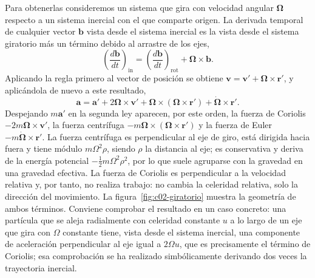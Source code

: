 \documentclass[10pt,openany]{book}
\begin{document}
Para obtenerlas consideremos un sistema que gira con velocidad angular \(\boldsymbol{\Omega}\) respecto a un sistema inercial con el que comparte origen. La derivada temporal de cualquier vector \(\mathbf{b}\) vista desde el sistema inercial es la vista desde el sistema giratorio más un término debido al arrastre de los ejes,
\begin{equation}
\left(\frac{d\mathbf{b}}{dt}\right)_{\mathrm{in}} = \left(\frac{d\mathbf{b}}{dt}\right)_{\mathrm{rot}} + \boldsymbol{\Omega}\times\mathbf{b}. \label{eq:c02-regla}
\end{equation}
Aplicando la regla primero al vector de posición se obtiene \(\mathbf{v} = \mathbf{v}' + \boldsymbol{\Omega}\times\mathbf{r}'\), y aplicándola de nuevo a este resultado,
\begin{equation}
\mathbf{a} = \mathbf{a}' + 2\boldsymbol{\Omega}\times\mathbf{v}' + \boldsymbol{\Omega}\times\left(\boldsymbol{\Omega}\times\mathbf{r}'\right) + \dot{\boldsymbol{\Omega}}\times\mathbf{r}'. \label{eq:c02-acel}
\end{equation}
Despejando \(m\mathbf{a}'\) en la segunda ley aparecen, por este orden, la fuerza de Coriolis \(-2m\boldsymbol{\Omega}\times\mathbf{v}'\), la fuerza centrífuga \(-m\boldsymbol{\Omega}\times(\boldsymbol{\Omega}\times\mathbf{r}')\) y la fuerza de Euler \(-m\dot{\boldsymbol{\Omega}}\times\mathbf{r}'\). La fuerza centrífuga es perpendicular al eje de giro, está dirigida hacia fuera y tiene módulo \(m\Omega^{2}\rho\), siendo \(\rho\) la distancia al eje; es conservativa y deriva de la energía potencial \(-\tfrac12 m\Omega^{2}\rho^{2}\), por lo que suele agruparse con la gravedad en una gravedad efectiva. La fuerza de Coriolis es perpendicular a la velocidad relativa y, por tanto, no realiza trabajo: no cambia la celeridad relativa, solo la dirección del movimiento. La figura~\ref{fig:c02-giratorio} muestra la geometría de ambos términos. Conviene comprobar el resultado en un caso concreto: una partícula que se aleja radialmente con celeridad constante \(u\) a lo largo de un eje que gira con \(\Omega\) constante tiene, vista desde el sistema inercial, una componente de aceleración perpendicular al eje igual a \(2\Omega u\), que es precisamente el término de Coriolis; esa comprobación se ha realizado simbólicamente derivando dos veces la trayectoria inercial.
\end{document}
